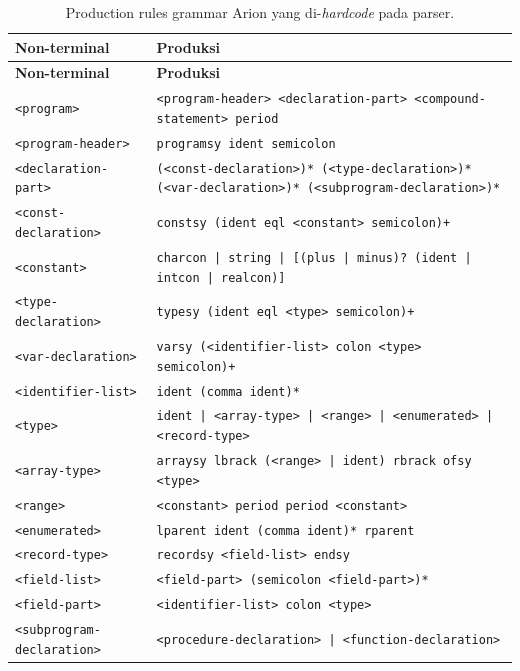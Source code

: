 \documentclass[11pt,a4paper]{article}
\begin{document}
\renewcommand{\arraystretch}{1.05}
\footnotesize
\begin{longtable}{l p{12cm}}
\caption{Production rules grammar Arion yang di-\textit{hardcode} pada parser.}\label{tab:grammar}\\
\toprule
\textbf{Non-terminal} & \textbf{Produksi} \\
\midrule
\endfirsthead

\toprule
\textbf{Non-terminal} & \textbf{Produksi} \\
\midrule
\endhead

\texttt{<program>}                & \texttt{<program-header> <declaration-part> <compound-statement> period} \\
\texttt{<program-header>}         & \texttt{programsy ident semicolon} \\
\texttt{<declaration-part>}       & \texttt{(<const-declaration>)* (<type-declaration>)* (<var-declaration>)* (<subprogram-declaration>)*} \\
\texttt{<const-declaration>}      & \texttt{constsy (ident eql <constant> semicolon)+} \\
\texttt{<constant>}               & \texttt{charcon | string | [(plus | minus)?\ (ident | intcon | realcon)]} \\
\texttt{<type-declaration>}       & \texttt{typesy (ident eql <type> semicolon)+} \\
\texttt{<var-declaration>}        & \texttt{varsy (<identifier-list> colon <type> semicolon)+} \\
\texttt{<identifier-list>}        & \texttt{ident (comma ident)*} \\
\texttt{<type>}                   & \texttt{ident | <array-type> | <range> | <enumerated> | <record-type>} \\
\texttt{<array-type>}             & \texttt{arraysy lbrack (<range> | ident) rbrack ofsy <type>} \\
\texttt{<range>}                  & \texttt{<constant> period period <constant>} \\
\texttt{<enumerated>}             & \texttt{lparent ident (comma ident)* rparent} \\
\texttt{<record-type>}            & \texttt{recordsy <field-list> endsy} \\
\texttt{<field-list>}             & \texttt{<field-part> (semicolon <field-part>)*} \\
\texttt{<field-part>}             & \texttt{<identifier-list> colon <type>} \\
\texttt{<subprogram-declaration>} & \texttt{<procedure-declaration> | <function-declaration>} \\

\end{longtable}
\end{document}
